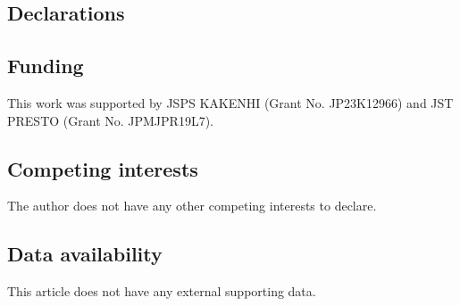 \documentclass{amsart}
\theoremstyle{plain}
\theoremstyle{definition}
\theoremstyle{remark}
\begin{document}
\subsection*{Declarations}

\subsection*{Funding}
This work was supported by JSPS KAKENHI (Grant No. JP23K12966) and JST PRESTO (Grant No. JPMJPR19L7).

\subsection*{Competing interests}
The author does not have any other competing interests to declare.

\subsection*{Data availability}
This article does not have any external supporting data.

\end{document}
